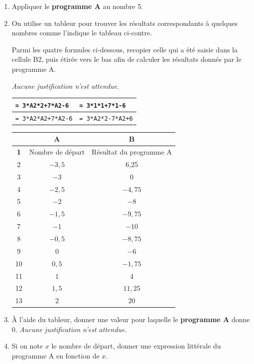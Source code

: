 \documentclass[11pt]{article}
\begin{document}
\begin{enumerate}
\item Appliquer le \textbf{programme A} au nombre 5.

\item On utilise un tableur pour trouver les résultats correspondants à quelques nombres comme l'indique le tableau ci-contre.

Parmi les quatre formules ci-dessous, recopier celle qui a été saisie dans la cellule B2, puis étirée vers le bas afin de calculer les résultats donnés par le programme A.

\emph{Aucune justification n'est attendue.}

\begin{center}
\begin{tabular}{|l|l|}\hline
\texttt{= 3*A2*2+7*A2-6} & \texttt{= 3*1*1+7*1-6} \\\hline
\texttt{= 3*A2*A2+7*A2-6} & \texttt{= 3*A2*2-7*A2+6} \\\hline
\end{tabular}
\end{center}

\begin{center}
\begin{tabular}{|c|c|c|}
\hline
 & \textbf{A} & \textbf{B} \\
\hline
\textbf{1} & Nombre de départ & Résultat du programme A \\
\hline
2 & $-3,5$ & 6,25 \\
3 & $-3$ & 0 \\
4 & $-2,5$ & $-4,75$ \\
5 & $-2$ & $-8$ \\
6 & $-1,5$ & $-9,75$ \\
7 & $-1$ & $-10$ \\
8 & $-0,5$ & $-8,75$ \\
9 & $0$ & $-6$ \\
10 & $0,5$ & $-1,75$ \\
11 & $1$ & $4$ \\
12 & $1,5$ & $11,25$ \\
13 & $2$ & $20$ \\
\hline
\end{tabular}
\end{center}

\item \`A l'aide du tableur, donner une valeur pour laquelle le \textbf{programme A} donne 0. \textit{Aucune justification n'est attendue.}

\item Si on note $x$ le nombre de départ, donner une expression littérale du programme A en fonction de $x$.
\end{enumerate}
\end{document}

